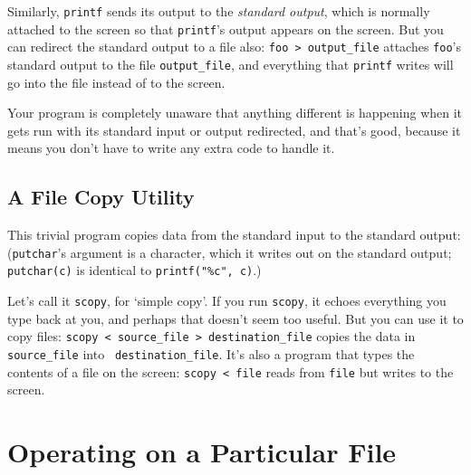 Similarly, {\tt printf} sends its output to the {\em standard output}\/,
which is normally attached to the screen so that {\tt printf}'s output
appears on the screen.  But you can redirect the standard output to a
file also: {\tt foo > output\_file} attaches {\tt foo}'s standard output
to the file {\tt output\_file}, and everything that {\tt printf} writes
will go into the file instead of to the screen.

Your program is completely unaware that anything different is
happening when it gets run with its standard input or output redirected,
and that's good, because it means you don't have to write any extra code
to handle it.

\subsection{A File Copy Utility}

This trivial program copies data from the standard input to the standard
output: ({\tt putchar}'s argument is a character, which it writes out on
the standard output; {\tt putchar(c)} is identical to {\tt printf("\%c",
c)}.)

\begin{flushleft}
\verb% #include <stdio.h>% \\*
\verb% % \\*
\verb% int main(void)% \\*
\verb% { % \\*
\verb%   int c;% \\*
\verb% % \\*
\verb%   while ((c = getchar()) != EOF)% \\*
\verb%     putchar(c);% \\*
\verb%   return 0;% \\*
\verb% }% \\*
\end{flushleft}

Let's call it {\tt scopy}, for `simple copy'.  If you run {\tt scopy},
it echoes everything you type back at you, and perhaps that doesn't seem
too useful.  But you can use it to copy files: {\tt scopy < source\_file
> destination\_file} copies the data in {\tt source\_file} into {\tt
destination\_file}.  It's also a program that types the contents of a
file on the screen:  {\tt scopy < file} reads from {\tt file} but writes
to the screen.

\section{Operating on a Particular File}

